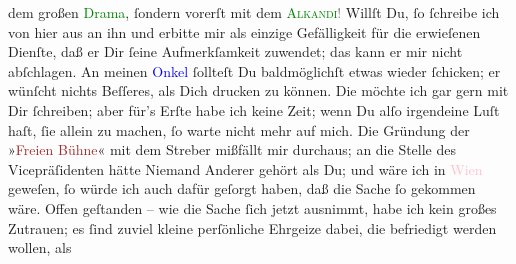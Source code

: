                dem großen \textcolor{green}{Drama}{}, ſondern vorerſt mit dem \textsc{\textcolor{green}{Alkandi}{}\ledrightnote{\textcolor{green}{Alkandi’s Lied}}}\textcolor{gray}{!} Willſt Du, ſo ſchreibe ich von hier aus an ihn und erbitte mir
               als einzige Gefälligkeit für die erwieſenen Dienſte, daß er Dir ſeine Aufmerkſamkeit
               zuwendet; das kann er mir nicht abſchlagen. An meinen \textcolor{blue}{Onkel}{}\ledrightnote{\textcolor{blue}{Fedor Mamroth}} ſollteſt Du baldmöglichſt etwas wieder ſchicken; er
               wünſcht nichts Beſſeres, als Dich drucken zu können. Die \label{K_L02668-12v}\label{K_L02668-12h} möchte ich gar gern mit Dir ſchreiben; aber für’s Erſte habe ich keine
               Zeit; wenn Du alſo irgendeine Luſt haſt, ſie allein zu machen, ſo warte nicht mehr
               auf mich. Die Gründung der »\textcolor{brown}{Freien Bühne}{}\ledrightnote{\textcolor{brown}{»Freie Bühne« Verein für moderne Literatur}}« mit dem
               Streber \label{K_L02668-9v}\label{K_L02668-9h} mißfällt mir
               durchaus; an die Stelle des Vicepräſidenten hätte Niemand Anderer gehört als Du; und
               wäre ich in \textcolor{pink}{Wien}{}\ledrightnote{\textcolor{pink}{Wien}} geweſen, ſo würde ich auch dafür
               geſorgt haben, daß die Sache {\pb}ſo gekommen wäre.
               Offen geſtanden – wie die Sache ſich jetzt ausnimmt, habe ich kein großes Zutrauen;
               es ſind zuviel kleine perſönliche Ehrgeize dabei, die befriedigt werden wollen, als
